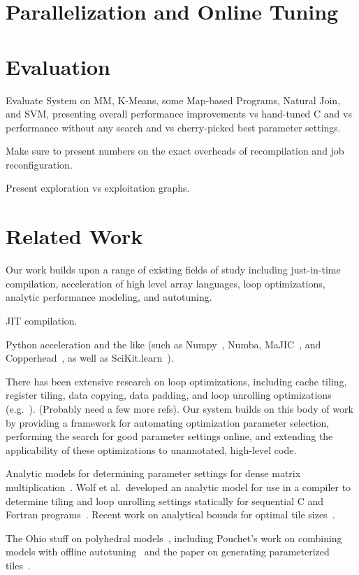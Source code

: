 \documentclass[preprint,9pt]{sigplanconf}
\begin{document}
\section{Parallelization and Online Tuning}
\label{online_tuning}

\section{Evaluation}
\label{evaluation}
Evaluate System on MM, K-Means, some Map-based Programs, Natural Join, and SVM, presenting overall performance improvements vs hand-tuned C and vs performance without any search and vs cherry-picked best parameter settings.

Make sure to present numbers on the exact overheads of recompilation and job reconfiguration.

Present exploration vs exploitation graphs.

\section{Related Work}
\label{related_work}
Our work builds upon a range of existing fields of study including just-in-time compilation, acceleration of high level array languages, loop optimizations, analytic performance modeling, and autotuning.

JIT compilation.

Python acceleration and the like (such as Numpy~\cite{Dubo96}, Numba, MaJIC~\cite{Alma02}, and Copperhead~\cite{Cata11}, as well as SciKit.learn~\cite{Pedr11}).

There has been extensive research on loop optimizations, including cache tiling, register tiling, data copying, data padding, and loop unrolling optimizations (e.g.~\cite{Lam91, Wolf91}). (Probably need a few more refs).  Our system builds on this body of work by providing a framework for automating optimization parameter selection, performing the search for good parameter settings online, and extending the applicability of these optimizations to unannotated, high-level code.

Analytic models for determining parameter settings for dense matrix multiplication~\cite{Cole95, Yoto03, Yoto05}.  Wolf et al.~developed an analytic model for use in a compiler to determine tiling and loop unrolling settings statically for sequential C and Fortran programs~\cite{Wolf96}.  Recent work on analytical bounds for optimal tile sizes~\cite{Shir12}.

The Ohio stuff on polyhedral models~\cite{Bond08}, including Pouchet's work on combining models with offline autotuning~\cite{Pouc10} and the paper on generating parameterized tiles~\cite{Hart09}.
\end{document}
